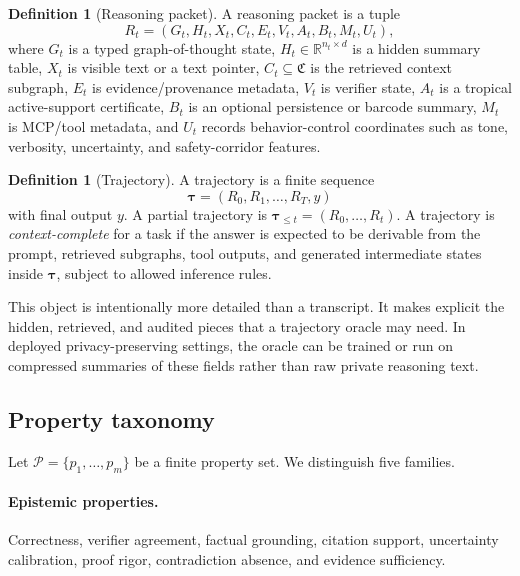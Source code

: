 \documentclass[11pt]{article}
\theoremstyle{definition}
\newtheorem{definition}[theorem]{Definition}
\theoremstyle{remark}
\newcommand{\R}{\mathbb{R}}
\newcommand{\traj}{\boldsymbol{\tau}}
\newcommand{\Prop}{\mathcal{P}}
\newcommand{\Ctx}{\mathfrak{C}}
\numberwithin{equation}{section}
\begin{document}
\begin{definition}[Reasoning packet]
A reasoning packet is a tuple
\begin{equation}
    R_t=(G_t,H_t,X_t,C_t,E_t,V_t,A_t,B_t,M_t,U_t),
\end{equation}
where \(G_t\) is a typed graph-of-thought state, \(H_t\in\R^{n_t\times d}\) is a hidden summary table, \(X_t\) is visible text or a text pointer, \(C_t\subseteq \Ctx\) is the retrieved context subgraph, \(E_t\) is evidence/provenance metadata, \(V_t\) is verifier state, \(A_t\) is a tropical active-support certificate, \(B_t\) is an optional persistence or barcode summary, \(M_t\) is MCP/tool metadata, and \(U_t\) records behavior-control coordinates such as tone, verbosity, uncertainty, and safety-corridor features.
\end{definition}

\begin{definition}[Trajectory]
A trajectory is a finite sequence
\begin{equation}
    \traj=(R_0,R_1,\ldots,R_T,y)
\end{equation}
with final output \(y\).  A partial trajectory is \(\traj_{\le t}=(R_0,\ldots,R_t)\).  A trajectory is \emph{context-complete} for a task if the answer is expected to be derivable from the prompt, retrieved subgraphs, tool outputs, and generated intermediate states inside \(\traj\), subject to allowed inference rules.
\end{definition}

This object is intentionally more detailed than a transcript.  It makes explicit the hidden, retrieved, and audited pieces that a trajectory oracle may need.  In deployed privacy-preserving settings, the oracle can be trained or run on compressed summaries of these fields rather than raw private reasoning text.

\subsection{Property taxonomy}

Let \(\Prop=\{p_1,\ldots,p_m\}\) be a finite property set.  We distinguish five families.

\paragraph{Epistemic properties.} Correctness, verifier agreement, factual grounding, citation support, uncertainty calibration, proof rigor, contradiction absence, and evidence sufficiency.
\end{document}
